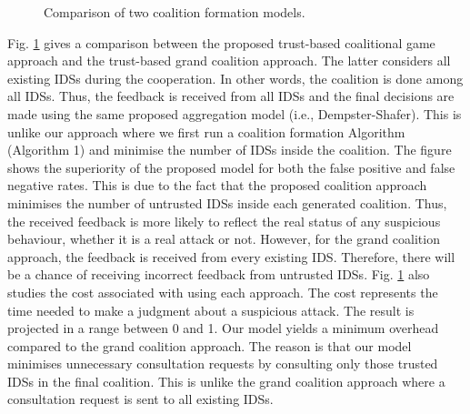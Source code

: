 \documentclass[conference]{IEEEtran}
\begin{document}
\begin{figure}[htbp]

\centering
{}
\caption{Comparison of two coalition formation models.}
\label{fig6}
\end{figure}


Fig. \ref{fig6} gives a comparison between the proposed trust-based coalitional game approach and the trust-based grand coalition approach. The latter considers all existing IDSs during the cooperation. In other words, the coalition is done among all IDSs. Thus, the feedback is received from all IDSs and the final decisions are made using the same proposed aggregation model (i.e., Dempster-Shafer). This is unlike our approach where we first run a coalition formation Algorithm (Algorithm 1) and minimise the number of IDSs inside the coalition. The figure shows the superiority of the proposed model for both the false positive and false negative rates. This is due to the fact that the proposed coalition approach minimises the number of untrusted IDSs inside each generated coalition. Thus, the received feedback is more likely to reflect the real status of any suspicious behaviour, whether it is a real attack or not. However, for the grand coalition approach, the feedback is received from every existing IDS. Therefore, there will be a chance of receiving incorrect feedback from untrusted IDSs.  Fig. \ref{fig6} also studies the cost associated with using each approach. The cost represents the time needed to make a judgment about a suspicious attack. The result is projected in a range between 0 and 1. Our model yields a minimum overhead compared to the grand coalition approach. The reason is that our model minimises unnecessary consultation requests by consulting only those trusted IDSs in the final coalition. This is unlike the grand coalition approach where a consultation request is sent to all existing IDSs.
\end{document}
